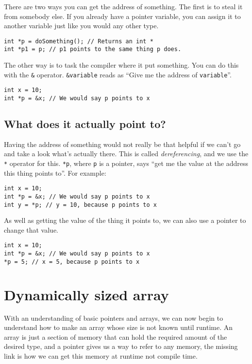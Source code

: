 There are two ways you can get the address of something.
The first is to steal it from somebody else.
If you already have a pointer variable, you can assign it to another variable just like you would any other type.

\begin{lstlisting}
int *p = doSomething(); // Returns an int *
int *p1 = p; // p1 points to the same thing p does.
\end{lstlisting}

The other way is to task the compiler where it put something.
You can do this with the \texttt{\&} operator.
\texttt{\&variable} reads as ``Give me the address of \texttt{variable}''.

\begin{lstlisting}
int x = 10;
int *p = &x; // We would say p points to x
\end{lstlisting}

\subsection{What does it actually point to?}

Having the address of something would not really be that helpful if we can't go and take a look what's actually there.
This is called \emph{dereferencing}, and we use the \texttt{*} operator for this.
\texttt{*p}, where \texttt{p} is a pointer, says ``get me the value at the address this thing points to''.
For example:

\begin{lstlisting}
int x = 10;
int *p = &x; // We would say p points to x
int y = *p; // y = 10, because p points to x
\end{lstlisting}

As well as getting the value of the thing it points to, we can also use a pointer to change that value.

\begin{lstlisting}
int x = 10;
int *p = &x; // We would say p points to x
*p = 5; // x = 5, because p points to x
\end{lstlisting}

\section{Dynamically sized array}

With an understanding of basic pointers and arrays, we can now begin to understand how to make an array whose size is not known until runtime.
An array is just a section of memory that can hold the required amount of the desired type, and a pointer gives us a way to refer to any memory, the missing link is how we can get this memory at runtime not compile time.

